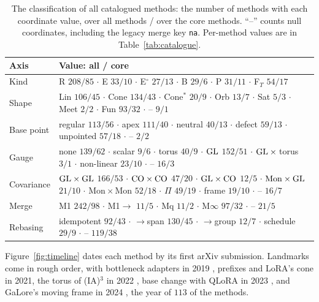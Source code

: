 \begin{table}[t]
\centering\footnotesize
\caption{The classification of all \nMethods{} catalogued methods: the number of methods with each coordinate value,
over all methods / over the \nCore{} core methods. ``--'' counts null coordinates, including the legacy merge key
\texttt{na}. Per-method values are in Table~\ref{tab:catalogue}.}\label{tab:atlas-counts}
\begin{tabularx}{\linewidth}{@{}>{\raggedright\arraybackslash}p{1.9cm}>{\raggedright\arraybackslash}X@{}}
\toprule\headrow
\textbf{Axis} & \textbf{Value: all / core}\\\midrule
Kind & R $208/85$ $\cdot$ E $33/10$ $\cdot$ E$^\circ$ $27/13$ $\cdot$ B $29/6$ $\cdot$ P $31/11$ $\cdot$ F$_T$ $54/17$\\
Shape & Lin $106/45$ $\cdot$ Cone $134/43$ $\cdot$ Cone$^*$ $20/9$ $\cdot$ Orb $13/7$ $\cdot$ Sat $5/3$ $\cdot$ Meet
$2/2$ $\cdot$ Fun $93/32$ $\cdot$ -- $9/1$\\
Base point & regular $113/56$ $\cdot$ apex $111/40$ $\cdot$ neutral $40/13$ $\cdot$ defect $59/13$ $\cdot$ unpointed
$57/18$ $\cdot$ -- $2/2$\\
Gauge & none $139/62$ $\cdot$ scalar $9/6$ $\cdot$ torus $40/9$ $\cdot$ $\mathrm{GL}$ $152/51$ $\cdot$ $\mathrm{GL}\times{}$torus $3/1$
$\cdot$ non-linear $23/10$ $\cdot$ -- $16/3$\\
Covariance & $\mathrm{GL}\times\mathrm{GL}$ $166/53$ $\cdot$ $\mathrm{CO}\times\mathrm{CO}$ $47/20$ $\cdot$ $\mathrm{GL}\times\mathrm{CO}$ $12/5$ $\cdot$
$\mathrm{Mon}\times\mathrm{GL}$ $21/10$ $\cdot$ $\mathrm{Mon}\times\mathrm{Mon}$ $52/18$ $\cdot$ $\Pi$ $49/19$ $\cdot$ frame
$19/10$ $\cdot$ -- $16/7$\\
Merge & M1 $242/98$ $\cdot$ M1$\to$ $11/5$ $\cdot$ Mq $11/2$ $\cdot$ M$\infty$ $97/32$ $\cdot$ -- $21/5$\\
Rebasing & idempotent $92/43$ $\cdot$ $\to$span $130/45$ $\cdot$ $\to$group $12/7$ $\cdot$ schedule $29/9$ $\cdot$ --
$119/38$\\
\bottomrule
\end{tabularx}
\end{table}

Figure~\ref{fig:timeline} dates each method by its first arXiv submission. Landmarks come in rough order, with
bottleneck adapters in 2019 \citep{houlsby2019parameter}, prefixes \citep{li2021prefix} and LoRA's cone
\citep{hu2021lora} in 2021, the torus of (IA)$^3$ in 2022 \citep{liu2022few}, base change with QLoRA in 2023
\citep{dettmers2023qlora}, and GaLore's moving frame in 2024 \citep{zhao2024galore}, the year of $113$ of the
\nMethods{} methods.


